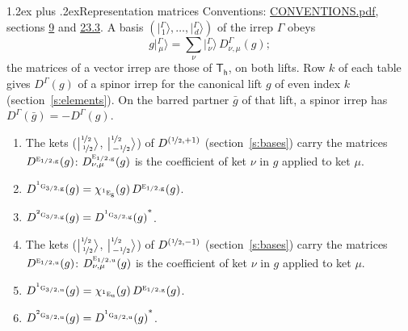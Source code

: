 \documentclass[10pt,a4paper]{article}
\makeatletter
\renewcommand\section{\@startsection{section}{1}{\z@}{-3ex plus -1ex minus -.2ex}%
  {1.2ex plus .2ex}{\normalfont\large\sffamily\bfseries\color{parttitle}}}
\numberwithin{equation}{section}
\newcommand{\grp}[1]{\mathsf{#1}}
\newcommand{\irr}[1]{\text{\normalfont\scshape #1}}
\newcommand{\conjpair}[1]{{}^{#1}}
\newcommand{\ptag}[1]{\mathrm{#1}}
\newcommand{\irrJp}[2]{D^{(#1,#2)}}
\newcommand{\repD}[1]{D^{#1}}
\newcommand{\irchar}[1]{\chi_{#1}}
\newcommand{\conj}[1]{{#1}^{*}}
\newcommand{\intx}{\mu}
\newcommand{\jm}[2]{\bigl\lvert{}^{#1}_{\,#2}\bigr\rangle}
\newcommand{\irket}[2]{\bigl\lvert{}^{#1}_{\,#2}\bigr\rangle}
\newcommand{\barred}[1]{\bar{#1}}
\newenvironment{romanlist}{\begin{enumerate}%
\renewcommand{\labelenumi}{(\roman{enumi})}}%
  {\end{enumerate}}
\makeatother
\begin{document}
\section{Representation matrices}\label{s:irrep_matrices}
Conventions: \href{../../CONVENTIONS.pdf}{CONVENTIONS.pdf}, sections \href{../../../rotation/CONVENTIONS.pdf\#conv.9}{9} and \href{../../CONVENTIONS.pdf\#conv.23.3}{23.3}.
\leavevmode\label{n:vector.ket.partner}\label{n:index.partner}\label{n:matrix.irrep}\label{n:index.partner.summed}A basis $(\irket{\Gamma}{1}, \dots, \irket{\Gamma}{d})$ of the irrep $\Gamma$ obeys
\begin{equation}\label{e:partner}g\irket{\Gamma}{\intx} = \sum_\nu \irket{\Gamma}{\nu}\, \repD{\Gamma}_{\nu,\intx}(g);\end{equation}
the matrices of a vector irrep are those of \href{../../../rotation/data/pdf/Th.pdf}{$\grp{T_{h}}$}, on both lifts. Row $k$ of each table gives $\repD{\Gamma}(g)$ of a spinor irrep for the canonical lift $g$ of even index $k$ (section~\ref{s:elements}). On the barred partner $\barred{g}$ of that lift, a spinor irrep has $\repD{\Gamma}(\barred{g}) = -\repD{\Gamma}(g)$.
\begin{romanlist}\raggedright
\item The kets ($\jm{\nicefrac{1}{2}}{\nicefrac{1}{2}}$, $\jm{\nicefrac{1}{2}}{-\nicefrac{1}{2}}$) of $\irrJp{\nicefrac{1}{2}}{+1}$ (section~\ref{s:bases}) carry the matrices $\repD{\irr{e}_{1/2,\ptag{g}}}(g)$: $\repD{\irr{e}_{1/2,\ptag{g}}}_{\nu,\intx}(g)$ is the coefficient of ket $\nu$ in $g$ applied to ket $\intx$.
\item $\repD{\conjpair{1}\irr{g}_{3/2,\ptag{g}}}(g) = \irchar{\conjpair{1}\irr{e}_{\ptag{g}}}(g)\, \repD{\irr{e}_{1/2,\ptag{g}}}(g)$.
\item $\repD{\conjpair{2}\irr{g}_{3/2,\ptag{g}}}(g) = \conj{\repD{\conjpair{1}\irr{g}_{3/2,\ptag{g}}}(g)}$.
\item The kets ($\jm{\nicefrac{1}{2}}{\nicefrac{1}{2}}$, $\jm{\nicefrac{1}{2}}{-\nicefrac{1}{2}}$) of $\irrJp{\nicefrac{1}{2}}{-1}$ (section~\ref{s:bases}) carry the matrices $\repD{\irr{e}_{1/2,\ptag{u}}}(g)$: $\repD{\irr{e}_{1/2,\ptag{u}}}_{\nu,\intx}(g)$ is the coefficient of ket $\nu$ in $g$ applied to ket $\intx$.
\item $\repD{\conjpair{1}\irr{g}_{3/2,\ptag{u}}}(g) = \irchar{\conjpair{1}\irr{e}_{\ptag{u}}}(g)\, \repD{\irr{e}_{1/2,\ptag{g}}}(g)$.
\item $\repD{\conjpair{2}\irr{g}_{3/2,\ptag{u}}}(g) = \conj{\repD{\conjpair{1}\irr{g}_{3/2,\ptag{u}}}(g)}$.
\end{romanlist}
\end{document}
